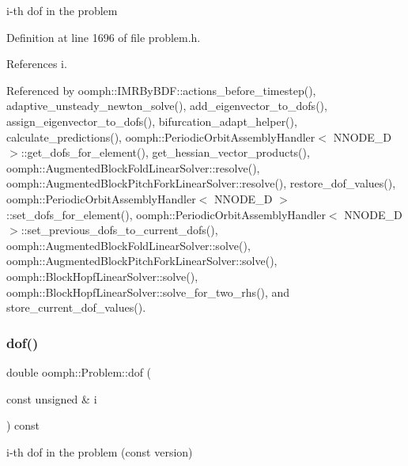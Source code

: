 i-\/th dof in the problem 



Definition at line 1696 of file problem.\+h.



References i.



Referenced by oomph\+::\+I\+M\+R\+By\+B\+D\+F\+::actions\+\_\+before\+\_\+timestep(), adaptive\+\_\+unsteady\+\_\+newton\+\_\+solve(), add\+\_\+eigenvector\+\_\+to\+\_\+dofs(), assign\+\_\+eigenvector\+\_\+to\+\_\+dofs(), bifurcation\+\_\+adapt\+\_\+helper(), calculate\+\_\+predictions(), oomph\+::\+Periodic\+Orbit\+Assembly\+Handler$<$ N\+N\+O\+D\+E\+\_\+D $>$\+::get\+\_\+dofs\+\_\+for\+\_\+element(), get\+\_\+hessian\+\_\+vector\+\_\+products(), oomph\+::\+Augmented\+Block\+Fold\+Linear\+Solver\+::resolve(), oomph\+::\+Augmented\+Block\+Pitch\+Fork\+Linear\+Solver\+::resolve(), restore\+\_\+dof\+\_\+values(), oomph\+::\+Periodic\+Orbit\+Assembly\+Handler$<$ N\+N\+O\+D\+E\+\_\+D $>$\+::set\+\_\+dofs\+\_\+for\+\_\+element(), oomph\+::\+Periodic\+Orbit\+Assembly\+Handler$<$ N\+N\+O\+D\+E\+\_\+D $>$\+::set\+\_\+previous\+\_\+dofs\+\_\+to\+\_\+current\+\_\+dofs(), oomph\+::\+Augmented\+Block\+Fold\+Linear\+Solver\+::solve(), oomph\+::\+Augmented\+Block\+Pitch\+Fork\+Linear\+Solver\+::solve(), oomph\+::\+Block\+Hopf\+Linear\+Solver\+::solve(), oomph\+::\+Block\+Hopf\+Linear\+Solver\+::solve\+\_\+for\+\_\+two\+\_\+rhs(), and store\+\_\+current\+\_\+dof\+\_\+values().

\mbox{\label{classoomph_1_1Problem_a200cbd03828632d448c3525e9a921f27}} 
\subsubsection{\texorpdfstring{dof()}{dof()}\hspace{0.1cm}{\footnotesize\ttfamily [2/2]}}
{\footnotesize\ttfamily double oomph\+::\+Problem\+::dof (\begin{DoxyParamCaption}\item[{const unsigned \&}]{i }\end{DoxyParamCaption}) const\hspace{0.3cm}{\ttfamily [inline]}}



i-\/th dof in the problem (const version) 



